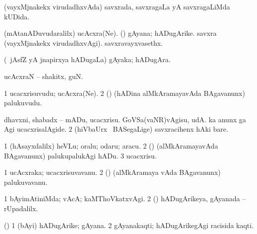 {{{{{{{{{{{{\bentry 
{} 
\gl{\gu}
\expl{}
\bmng
 (vayxMjnakekx virudadhxvAda) savxrada, savxragaLa yA savxragaLiMda kUDida. 
\emng
\eentry

\bentry
{} 
\gl{\kirx}
\expl{}
\bmng
\emng
\eentry

\bentry 
{} 
\gl{\nA}
\expl{}
\bmng
\bnum
{} 
\banum
{} (mAtanADuvudaralilx) ucAcxra(Ne). 
 (\saM) gAyana; hADugArike. 
\eanum
\numie
{} 
\banum
{} savxra (vayxMjnakekx virudadhxvAgi). 
 savxravayxvasethx. 
\eanum
\numie
\enum
\emng
\eentry

\bentry
{} 
\gl{\nA}
\expl{}
\bmng
 (\kanmu\ jAsfZ yA jnapirxya hADugaLa) gAyaka; hADugAra. 
\emng
\eentry

\bentry 
{} 
\gl{\nA}
\expl{}
\bmng
 ucAcxraN -- shakitx, guN. 
\emng
\eentry

\bentry 
{} 
\gl{\nA}
\expl{}
\bmng
\bnum
\num{1} ucacxrisuvudu; ucAcxra(Ne). 
\num{2} (\saM) (hADina alMkAramayavAda BAgavanunx) palukuvudu. 
\enum
\emng
\eentry

\bentry
{} 
\gl{\sakirx}
\expl{}
\bmng
\bnum
{} 
\banum
{} dhavxni, shabadx -- mADu, ucacxrisu. 
 GoVSa(vaNR)vAgisu, udA.  ka anunx ga Agi ucacxrisalAgide. 
\eanum
\numie
\num{2} (hiVbaUrx \mo\ BASegaLige) savxracihenx hAki bare. 
\enum
\emng

\noindent 
\gl{\akirx}
\expl{}
\bmng
\bnum
\num{1} (hAsayxdalilx) heVLu; oralu; odaru; aracu. 
\num{2} (\saM) (alMkAramayavAda BAgavanunx) palukupalukAgi hADu. 
\num{3} ucacxrisu. 
\enum
\emng
\eentry

\bentry
{} 
\gl{\nA}
\expl{}
\bmng
\bnum
\num{1} ucAcxraka; ucacxrisuvavanu. 
\num{2} (\saM) (alMkAramaya vAda BAgavanunx) palukuvavanu. 
\enum
\emng
\eentry

\bentry
{} 
\gl{\kirxvi}
\expl{}
\bmng
\bnum
\num{1} bAyimAtiniMda; vAcA; kaMThoVkatxvAgi. 
\num{2} (\saM) hADugArikeya, gAyanada -- rUpadalilx. 
\enum
\emng
\eentry

\bentry
{}
\gl{\nA}
\expl{}
\bmng
 (\saM) 
\bnum
\num{1} (bAyi) hADugArike; gAyana. 
\num{2} gAyanakaqti; hADugArikegAgi racisida kaqti. 
\enum
\emng
\eentry

}}}}}}}}}}}}
